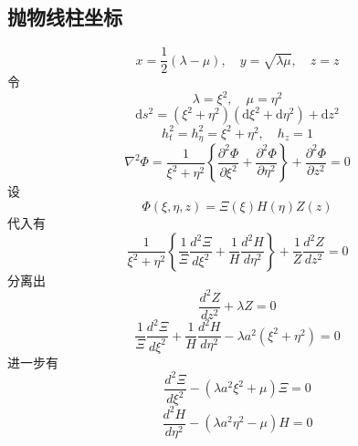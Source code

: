 \documentclass[a4paper]{ctexart}
\begin{document}
\subsection{抛物线柱坐标}
\[
    x=\frac{1}{2}(\lambda-\mu), \quad y=\sqrt{\lambda \mu}, \quad z=z
\]
令
\[
    \lambda=\xi^{2}, \quad \mu=\eta^{2}
\]
\[
    \mathrm{d} s^{2}=\left(\xi^{2}+\eta^{2}\right)\left(\mathrm{d} \xi^{2}+\mathrm{d} \eta^{2}\right)+\mathrm{d} z^{2}
\]
\[
    h_{t}^{2}=h_{\eta}^{2} =\xi^{2}+\eta^{2}, \quad h_{z}=1
\]
\[
    \nabla^{2} \Phi=\frac{1}{\xi^{2}+\eta^{2}}\left\{\frac{\partial^{2} \Phi}{\partial \xi^{2}}+\frac{\partial^{2} \Phi}{\partial \eta^{2}}\right\}+\frac{\partial^{2} \Phi}{\partial z^{2}}=0
\]
设
$$
    \Phi \left( \xi ,\eta ,z \right) =\varXi \left( \xi \right) H\left( \eta \right) Z\left( z \right)
$$
代入有
$$
    \frac{1}{\xi ^2+\eta ^2}\left\{ \frac{1}{\varXi}\frac{d^2\varXi}{d\xi ^2}+\frac{1}{H}\frac{d^2H}{d\eta ^2} \right\} +\frac{1}{Z}\frac{d^2Z}{dz^2}=0
$$
分离出
\begin{equation}
    \frac{d^2Z}{dz^2}+\lambda Z=0
\end{equation}
$$
    \frac{1}{\varXi}\frac{d^2\varXi}{d\xi ^2}+\frac{1}{H}\frac{d^2H}{d\eta ^2}-\lambda a^2\left( \xi ^2+\eta ^2 \right) =0
$$
进一步有
\begin{equation}
    \frac{d^2\varXi}{d\xi ^2}-\left( \lambda a^2\xi ^2+\mu \right) \varXi =0
\end{equation}
\begin{equation}
    \frac{d^2H}{d\eta ^2}-\left( \lambda a^2\eta ^2-\mu \right) H=0
\end{equation}
\end{document}
